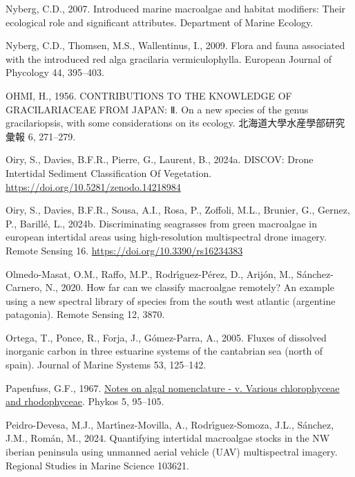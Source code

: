 \documentclass[
  letterpaper,
  DIV=11,
  numbers=noendperiod]{scrartcl}
\newlength{\cslhangindent}
\newenvironment{CSLReferences}[2] %
 {\begin{list}{}{%
  \setlength{\itemindent}{0pt}
  \setlength{\leftmargin}{0pt}
  \setlength{\parsep}{0pt}
  \ifodd #1
   \setlength{\leftmargin}{\cslhangindent}
   \setlength{\itemindent}{-1\cslhangindent}
  \fi
  \setlength{\itemsep}{#2\baselineskip}}}
 {\end{list}}
\begin{document}
\begin{CSLReferences}{1}{0}
Nyberg, C.D., 2007. Introduced marine macroalgae and habitat modifiers:
Their ecological role and significant attributes. Department of Marine
Ecology.

Nyberg, C.D., Thomsen, M.S., Wallentinus, I., 2009. Flora and fauna
associated with the introduced red alga gracilaria vermiculophylla.
European Journal of Phycology 44, 395--403.

OHMI, H., 1956. CONTRIBUTIONS TO THE KNOWLEDGE OF GRACILARIACEAE FROM
JAPAN: Ⅱ. On a new species of the genus gracilariopsis, with some
considerations on its ecology. 北海道大學水産學部研究彙報 6, 271--279.

Oiry, S., Davies, B.F.R., Pierre, G., Laurent, B., 2024a. {DISCOV: Drone
Intertidal Sediment Classification Of Vegetation}.
\url{https://doi.org/10.5281/zenodo.14218984}

Oiry, S., Davies, B.F.R., Sousa, A.I., Rosa, P., Zoffoli, M.L., Brunier,
G., Gernez, P., Barillé, L., 2024b. Discriminating seagrasses from green
macroalgae in european intertidal areas using high-resolution
multispectral drone imagery. Remote Sensing 16.
\url{https://doi.org/10.3390/rs16234383}

Olmedo-Masat, O.M., Raffo, M.P., Rodrı́guez-Pérez, D., Arijón, M.,
Sánchez-Carnero, N., 2020. How far can we classify macroalgae remotely?
An example using a new spectral library of species from the south west
atlantic (argentine patagonia). Remote Sensing 12, 3870.

Ortega, T., Ponce, R., Forja, J., Gómez-Parra, A., 2005. Fluxes of
dissolved inorganic carbon in three estuarine systems of the cantabrian
sea (north of spain). Journal of Marine Systems 53, 125--142.

Papenfuss, G.F., 1967.
\href{https://marinespecies.org/aphia.php?p=sourcedetails&id=303450}{Notes
on algal nomenclature - v. Various chlorophyceae and rhodophyceae}.
Phykos 5, 95--105.

Peidro-Devesa, M.J., Martı́nez-Movilla, A., Rodrı́guez-Somoza, J.L.,
Sánchez, J.M., Román, M., 2024. Quantifying intertidal macroalgae stocks
in the NW iberian peninsula using unmanned aerial vehicle (UAV)
multispectral imagery. Regional Studies in Marine Science 103621.


\end{CSLReferences}
\end{document}
